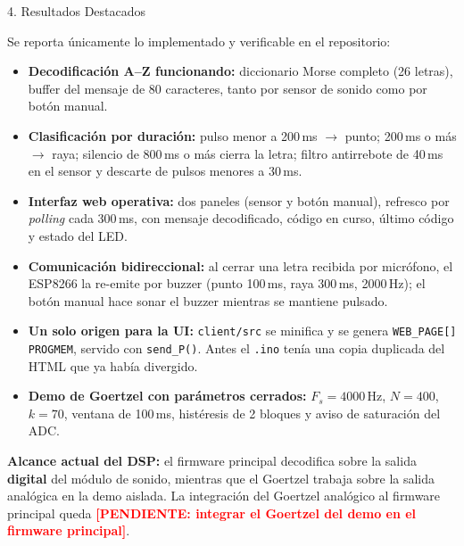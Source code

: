 \documentclass[final]{beamer}
\newlength{\onecolwid}
\newlength{\twocolwid}
\newcommand{\pendiente}[1]{\textcolor{red}{\textbf{[PENDIENTE: #1]}}}
\begin{document}
\begin{frame}[t]
\begin{columns}[t]
\begin{column}{\twocolwid}
\begin{columns}[t,totalwidth=\twocolwid]
\begin{column}{\onecolwid}
\end{column}

\end{columns}

\begin{alertblock}{4. Resultados Destacados}

Se reporta únicamente lo implementado y verificable en el repositorio:

\begin{itemize}
\item \textbf{Decodificación A--Z funcionando:} diccionario Morse completo (26 letras), buffer del mensaje de 80 caracteres, tanto por sensor de sonido como por botón manual.
\item \textbf{Clasificación por duración:} pulso menor a 200\,ms $\rightarrow$ punto; 200\,ms o más $\rightarrow$ raya; silencio de 800\,ms o más cierra la letra; filtro antirrebote de 40\,ms en el sensor y descarte de pulsos menores a 30\,ms.
\item \textbf{Interfaz web operativa:} dos paneles (sensor y botón manual), refresco por \textit{polling} cada 300\,ms, con mensaje decodificado, código en curso, último código y estado del LED.
\item \textbf{Comunicación bidireccional:} al cerrar una letra recibida por micrófono, el ESP8266 la re-emite por buzzer (punto 100\,ms, raya 300\,ms, 2000\,Hz); el botón manual hace sonar el buzzer mientras se mantiene pulsado.
\item \textbf{Un solo origen para la UI:} \texttt{client/src} se minifica y se genera \texttt{WEB\_PAGE[] PROGMEM}, servido con \texttt{send\_P()}. Antes el \texttt{.ino} tenía una copia duplicada del HTML que ya había divergido.
\item \textbf{Demo de Goertzel con parámetros cerrados:} $F_s = 4000$\,Hz, $N = 400$, $k = 70$, ventana de 100\,ms, histéresis de 2 bloques y aviso de saturación del ADC.
\end{itemize}

\textbf{Alcance actual del DSP:} el firmware principal decodifica sobre la salida \textbf{digital} del módulo de sonido, mientras que el Goertzel trabaja sobre la salida analógica en la demo aislada. La integración del Goertzel analógico al firmware principal queda \pendiente{integrar el Goertzel del demo en el firmware principal}.


\end{alertblock}
\end{column}
\end{columns}
\end{frame}
\end{document}
